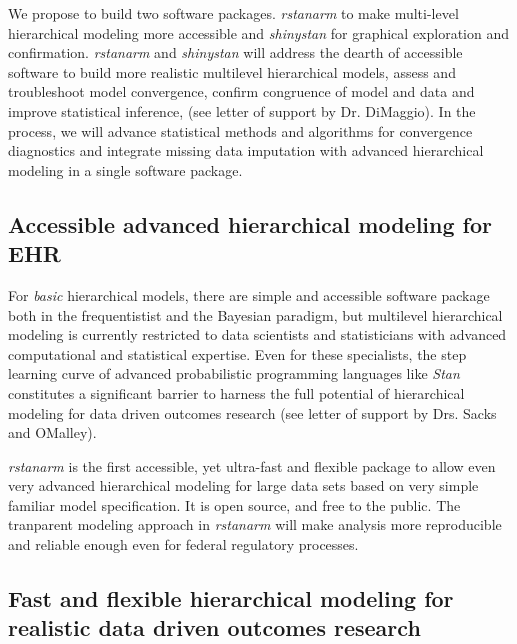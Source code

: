 \documentclass[11pt,notitlepage]{article}
\begin{document}
We propose to build two software packages. \textit{rstanarm} to make multi-level hierarchical modeling more accessible and \textit{shinystan} for graphical exploration and confirmation. \textit{rstanarm} and \textit{shinystan} will address the dearth of accessible software to build more realistic multilevel hierarchical models, assess and troubleshoot model convergence, confirm congruence of model and data and improve statistical inference, (see letter of support by Dr. DiMaggio). In the process, we will advance statistical methods and algorithms for convergence diagnostics and integrate missing data imputation with advanced hierarchical modeling in a single software package.  

\subsection*{Accessible advanced hierarchical modeling for EHR}

For \textit{basic} hierarchical models, there are simple and accessible software package both in the frequentistist and the Bayesian paradigm, but multilevel hierarchical modeling is currently restricted to data scientists and statisticians with advanced computational and statistical expertise. Even for these specialists, the step learning curve of advanced probabilistic programming languages like \textit{Stan} constitutes a significant barrier to harness the full potential of hierarchical modeling for data driven outcomes research (see letter of support by Drs. Sacks and OMalley).

\textit{rstanarm} is the first accessible, yet ultra-fast and flexible package to allow even very advanced hierarchical modeling for large data sets based on very simple familiar model specification. It is open source, and free to the public. The tranparent modeling approach in \textit{rstanarm} will make analysis more reproducible and reliable enough even for federal regulatory processes. 

\subsection*{Fast and flexible hierarchical modeling for realistic data driven outcomes research }
\end{document}
